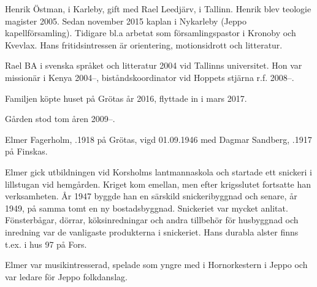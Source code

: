 


Henrik Östman,  i Karleby, gift med Rael Leedjärv,   i Tallinn. Henrik blev teologie magister 2005. Sedan november 2015 kaplan i Nykarleby (Jeppo kapellförsamling). Tidigare bl.a arbetat som församlingspastor i Kronoby och Kvevlax. Hans fritidsintressen är orientering, motionsidrott och litteratur.

Rael BA i svenska språket och litteratur 2004 vid Tallinns universitet. Hon var missionär i Kenya 2004--, biståndskoordinator vid Hoppets stjärna r.f. 2008--.
\begin{jhchildren}
  \item {}
  \item {}
\end{jhchildren}
Familjen köpte huset på Grötas år 2016, flyttade in i mars 2017.


Gården stod tom åren 2009--.\jhvspace{}


Elmer Fagerholm, .1918 på Grötas, vigd 01.09.1946 med Dagmar Sandberg, .1917 på Finskas.
\begin{jhchildren}
  \item {}
  \item {}
\end{jhchildren}

Elmer gick utbildningen vid Korsholms lantmannaskola och startade ett snickeri i lillstugan vid hemgården. Kriget kom emellan, men efter krigsslutet fortsatte han verksamheten. År 1947 byggde han en särskild snickeribyggnad och senare, år 1949, på samma tomt en ny bostadsbyggnad. Snickeriet var mycket anlitat. Fönsterbågar, dörrar, köksinredningar och andra tillbehör för husbyggnad och inredning var de vanligaste produkterna i snickeriet. Hans durabla alster finns t.ex. i hus 97 på Fors.

Elmer var musikintresserad, spelade som yngre med i Hornorkestern i Jeppo och var ledare för Jeppo folkdanslag.

